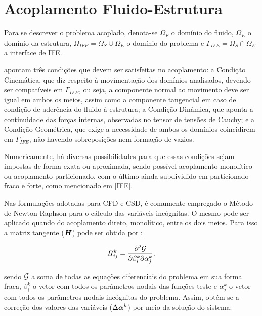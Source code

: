 \chapter{Acoplamento Fluido-Estrutura} \label{AFE}

Para se descrever o problema acoplado, denota-se $\Omega_F$ o domínio do fluido, $\Omega_E$ o domínio da estrutura, $\Omega_{IFE}=\Omega_S\cup\Omega_E$ o domínio do problema e $\Gamma_{IFE}=\Omega_S\cap\Omega_E$ a interface de IFE.

 apontam três condições que devem ser satisfeitas no acoplamento: a Condição Cinemática, que diz respeito à movimentação dos domínios analisados, devendo ser compatíveis em $\Gamma_{IFE}$, ou seja, a componente normal ao movimento deve ser igual em ambos os meios, assim como a componente tangencial em caso de condição de aderência do fluido à estrutura; a Condição Dinâmica, que aponta a continuidade das forças internas, observadas no tensor de tensões de Cauchy; e a Condição Geométrica, que exige a necessidade de ambos os domínios coincidirem em $\Gamma_{IFE}$, não havendo sobreposições nem formação de vazios.

Numericamente, há diversas possibilidades para que essas condições sejam impostas de forma exata ou aproximada, sendo possível acoplamento monolítico ou acoplamento particionado, com o último ainda subdividido em particionado fraco e forte, como mencionado em \ref{IFE}. %

Nas formulações adotadas para CFD e CSD, é comumente empregado o Método de Newton-Raphson para o cálculo das variáveis incógnitas. O mesmo pode ser aplicado quando do acoplamento direto, monolítico, entre os dois meios. Para isso a matriz tangente ($\boldsymbol{H}$) pode ser obtida por \cite{bazilevs2013computational,sanches2022metodos}:

\begin{equation}
    H_{ij}^k=\frac{\partial^2{\mathcal{G}}}{\partial{\beta_i^k}\partial{\alpha_j^k}}\text{,}
\end{equation}

\noindent sendo $\mathcal{G}$ a soma de todas as equações diferenciais do problema em sua forma fraca, $\beta_i^k$ o vetor com todos os parâmetros nodais das funções teste e $\alpha_j^k$ o vetor com todos os parâmetros nodais incógnitas do problema. Assim, obtém-se a correção dos valores das variáveis ($\Delta\boldsymbol{\alpha}^k$) por meio da solução do sistema:

